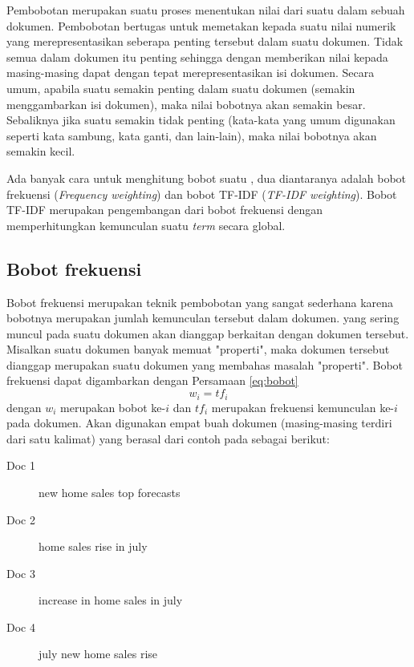Pembobotan \term merupakan suatu proses menentukan nilai dari suatu \term dalam sebuah dokumen. Pembobotan \term bertugas untuk memetakan \term kepada suatu nilai numerik yang merepresentasikan seberapa penting \term tersebut dalam suatu dokumen. Tidak semua \term dalam dokumen itu penting sehingga dengan memberikan nilai kepada masing-masing \term dapat dengan tepat merepresentasikan isi dokumen. Secara umum, apabila suatu \term semakin penting dalam suatu dokumen (semakin menggambarkan isi dokumen), maka nilai bobotnya akan semakin besar. Sebaliknya jika suatu \term semakin tidak penting (kata-kata yang umum digunakan seperti kata sambung, kata ganti, dan lain-lain), maka nilai bobotnya akan semakin kecil.

Ada banyak cara untuk menghitung bobot suatu \term, dua diantaranya adalah bobot frekuensi (\textit{Frequency weighting}) dan bobot TF-IDF (\textit{TF-IDF weighting}). Bobot TF-IDF merupakan pengembangan dari bobot frekuensi dengan memperhitungkan kemunculan suatu \textit{term} secara global.

\subsection{Bobot frekuensi}
\label{sub:freq}
Bobot frekuensi merupakan teknik pembobotan yang sangat sederhana karena bobotnya merupakan jumlah kemunculan \term tersebut dalam dokumen. \term yang sering muncul pada suatu dokumen akan dianggap berkaitan dengan dokumen tersebut. Misalkan suatu dokumen banyak memuat \term "properti", maka dokumen tersebut dianggap merupakan suatu dokumen yang membahas masalah "properti". Bobot frekuensi dapat digambarkan dengan Persamaan \ref{eq:bobot}
\begin{equation}
\label{eq:bobot}
w_i=tf_i
\end{equation}
dengan $w_i$ merupakan bobot \term ke-$i$ dan $tf_i$ merupakan frekuensi kemunculan \term ke-$i$ pada dokumen. Akan digunakan empat buah dokumen (masing-masing terdiri dari satu kalimat) yang berasal dari contoh pada \cite{schutze2008introduction} sebagai berikut:

\begin{description}
	\item[Doc 1] new home sales top forecasts
	\item[Doc 2] home sales rise in july
	\item[Doc 3] increase in home sales in july
	\item[Doc 4] july new home sales rise
\end{description}

